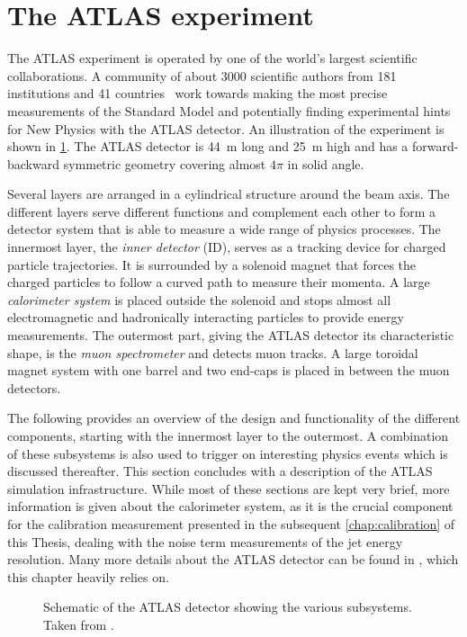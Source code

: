 \section{The ATLAS experiment}

The ATLAS experiment is operated by one of the world's largest scientific collaborations. A community of about 3000 scientific authors from 181 institutions and 41 countries~\cite{AtlasCollab} work towards making the most precise measurements of the Standard Model and potentially finding experimental hints for New Physics with the ATLAS detector.
An illustration of the experiment is shown in \cref{fig:ATLASlayout}.
The ATLAS detector is \SI{44}{\meter} long and \SI{25}{\meter} high and has a forward-backward symmetric geometry covering almost $4\pi$ in solid angle.

Several layers are arranged in a cylindrical structure around the beam axis.
The different layers serve different functions and complement each other to form a detector system that is able to measure a wide range of physics processes.
The innermost layer, the \emph{inner detector} (ID), serves as a tracking device for charged particle trajectories. It is surrounded by a solenoid magnet that forces the charged particles to follow a curved path to measure their momenta.
A large \emph{calorimeter system} is placed outside the solenoid and stops almost all electromagnetic and hadronically interacting particles to provide energy measurements. The outermost part, giving the ATLAS detector its characteristic shape, is the \emph{muon spectrometer} and detects muon tracks. A large toroidal magnet system with one barrel and two end-caps is placed in between the muon detectors.

The following provides an overview of the design and functionality of the different components, starting with the innermost layer to the outermost.
A combination of these subsystems is also used to trigger on interesting physics events which is discussed thereafter.
This section concludes with a description of the ATLAS simulation infrastructure. 
While most of these sections are kept very brief, more information is given about the calorimeter system, as it is the crucial component for the calibration measurement presented in the subsequent \cref{chap:calibration} of this Thesis, dealing with the noise term measurements of the jet energy resolution.
Many more details about the ATLAS detector can be found in , which this chapter heavily relies on.


\begin{figure}
    \caption[Schematic of the ATLAS detector showing the various subsystems.]{Schematic of the ATLAS detector showing the various subsystems. Taken from .}
    \label{fig:ATLASlayout}
\end{figure}

